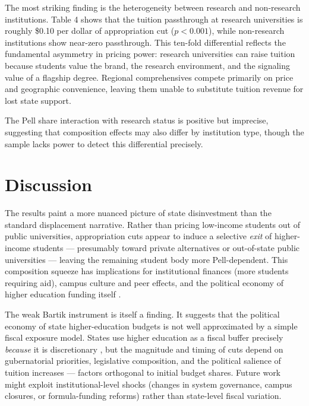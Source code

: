 \documentclass[12pt]{article}
\begin{document}


The most striking finding is the heterogeneity between research and non-research institutions. Table 4 shows that the tuition passthrough at research universities is roughly \$0.10 per dollar of appropriation cut ($p < 0.001$), while non-research institutions show near-zero passthrough. This ten-fold differential reflects the fundamental asymmetry in pricing power: research universities can raise tuition because students value the brand, the research environment, and the signaling value of a flagship degree. Regional comprehensives compete primarily on price and geographic convenience, leaving them unable to substitute tuition revenue for lost state support.

The Pell share interaction with research status is positive but imprecise, suggesting that composition effects may also differ by institution type, though the sample lacks power to detect this differential precisely.

\section{Discussion}
\label{sec:discussion}

The results paint a more nuanced picture of state disinvestment than the standard displacement narrative. Rather than pricing low-income students out of public universities, appropriation cuts appear to induce a selective \textit{exit} of higher-income students --- presumably toward private alternatives or out-of-state public universities --- leaving the remaining student body more Pell-dependent. This composition squeeze has implications for institutional finances (more students requiring aid), campus culture and peer effects, and the political economy of higher education funding itself \citep{hoxby2009changing}.

The weak Bartik instrument is itself a finding. It suggests that the political economy of state higher-education budgets is not well approximated by a simple fiscal exposure model. States use higher education as a fiscal buffer precisely \textit{because} it is discretionary \citep{delaney2011state}, but the magnitude and timing of cuts depend on gubernatorial priorities, legislative composition, and the political salience of tuition increases --- factors orthogonal to initial budget shares. Future work might exploit institutional-level shocks (changes in system governance, campus closures, or formula-funding reforms) rather than state-level fiscal variation.
\end{document}
